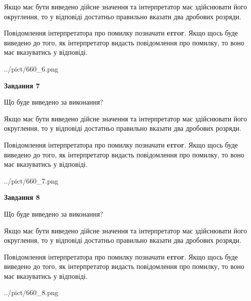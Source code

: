 \documentclass[12pt, ukrainian]{article}
\begin{document}
{\begin {Large}
Якщо має бути виведено дійсне значення та інтерпретатор має здійснювати його округлення, 
то у відповіді достатньо правильно вказати два дробових розряди.

Повідомлення інтерпретатора про помилку позначати \textbf{error}.
Якщо щось буде виведено до того, як інтерпретатор видасть повідомлення про помилку, 
то воно має вказуватись у відповіді. \par

\begin{center}
	{../pict/660_6.png}
\end{center}
\newpage

{\begin {center}\textbf{Завдання 7}\end {center}}\par
Що буде виведено за виконання? \par

Якщо має бути виведено дійсне значення та інтерпретатор має здійснювати його округлення, 
то у відповіді достатньо правильно вказати два дробових розряди.

Повідомлення інтерпретатора про помилку позначати \textbf{error}.
Якщо щось буде виведено до того, як інтерпретатор видасть повідомлення про помилку, 
то воно має вказуватись у відповіді. \par

\begin{center}
	{../pict/660_7.png}
\end{center}
\newpage

{\begin {center}\textbf{Завдання 8}\end {center}}\par
Що буде виведено за виконання? \par

Якщо має бути виведено дійсне значення та інтерпретатор має здійснювати його округлення, 
то у відповіді достатньо правильно вказати два дробових розряди.

Повідомлення інтерпретатора про помилку позначати \textbf{error}.
Якщо щось буде виведено до того, як інтерпретатор видасть повідомлення про помилку, 
то воно має вказуватись у відповіді. \par

\begin{center}
	{../pict/660_8.png}
\end{center}
\newpage


\end{Large}}
\end{document}
